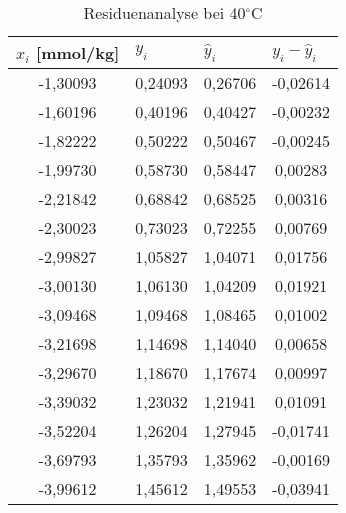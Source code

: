 \begin{table}[H]
  \centering
  \caption{Residuenanalyse bei 40$^\circ$C}
    \begin{tabular}{cccc}
    \toprule
    \multicolumn{1}{l}{\boldmath{}\textbf{$x_i$ [mmol/kg]}\unboldmath{}} & \multicolumn{1}{l}{\boldmath{}\textbf{$y_i$}\unboldmath{}} & \multicolumn{1}{l}{\boldmath{}\textbf{$\hat{y}_i$}\unboldmath{}} & \multicolumn{1}{l}{\boldmath{}\textbf{$y_i - \hat{y}_i$}\unboldmath{}} \\
    \midrule
    -1,30093 & 0,24093 & 0,26706 & -0,02614 \\
    -1,60196 & 0,40196 & 0,40427 & -0,00232 \\
    -1,82222 & 0,50222 & 0,50467 & -0,00245 \\
    -1,99730 & 0,58730 & 0,58447 & 0,00283 \\
    -2,21842 & 0,68842 & 0,68525 & 0,00316 \\
    -2,30023 & 0,73023 & 0,72255 & 0,00769 \\
    -2,99827 & 1,05827 & 1,04071 & 0,01756 \\
    -3,00130 & 1,06130 & 1,04209 & 0,01921 \\
    -3,09468 & 1,09468 & 1,08465 & 0,01002 \\
    -3,21698 & 1,14698 & 1,14040 & 0,00658 \\
    -3,29670 & 1,18670 & 1,17674 & 0,00997 \\
    -3,39032 & 1,23032 & 1,21941 & 0,01091 \\
    -3,52204 & 1,26204 & 1,27945 & -0,01741 \\
    -3,69793 & 1,35793 & 1,35962 & -0,00169 \\
    -3,99612 & 1,45612 & 1,49553 & -0,03941 \\
    \bottomrule
    \end{tabular}%
  \label{tab:addlabel}%
\end{table}%
